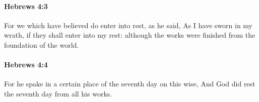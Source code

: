 		\paragraph{Hebrews 4:3} %
			\label{HEBREWS-4-3}

			For we which have believed do enter into rest, as he said, As I have sworn in my wrath, if they shall enter into my rest: although the works were finished from the foundation of the world.

			\begin{framed}
			\scriptsize
				\begin{compactdesc}
					\item[SBLG] 
				\end{compactdesc}
			\end{framed}

		\paragraph{Hebrews 4:4} %
			\label{HEBREWS-4-4}

			For he spake in a certain place of the seventh day on this wise, And God did rest the seventh day from all his works.

